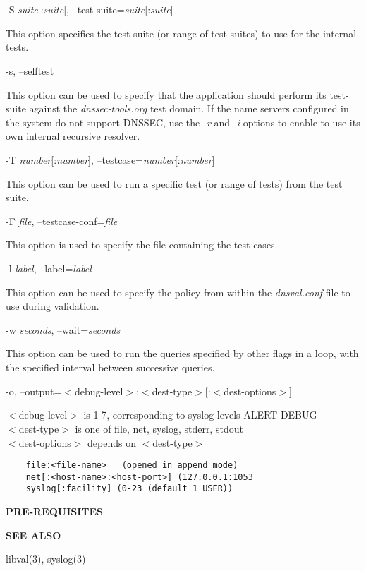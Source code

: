 \begin{description}
\item -S {\it suite}[:{\it suite}], --test-suite={\it suite}[:{\it suite}]\verb" "

This option specifies the test suite (or range of test suites) to use 
for the internal tests.

\item -s, --selftest\verb" "

This option can be used to specify that the application should perform its
test-suite against the {\it dnssec-tools.org} test domain.  If the name
servers configured in the system  do not support DNSSEC, use
the {\it -r} and {\it -i} options to enable  to use its own
internal recursive resolver.

\item -T {\it number}[:{\it number}], --testcase={\it number}[:{\it number}]\verb" "

This option can be used to run a specific test (or range of tests) 
from the test suite.

\item -F {\it file}, --testcase-conf={\it file} \verb" "

This option is used to specify the file containing the test cases.

\item -l {\it label}, --label={\it label} \verb" "

This option can be used to specify the policy from within the {\it dnsval.conf} 
file to use during validation. 

\item -w {\it seconds}, --wait={\it seconds} \verb" "

This option can be used to run the queries specified by other flags in a loop,
with the specified interval between successive queries.

\item -o, --output=$<$debug-level$>$:$<$dest-type$>$[:$<$dest-options$>$]\verb" "

$<$debug-level$>$ is 1-7, corresponding to syslog levels ALERT-DEBUG \\
$<$dest-type$>$ is one of file, net, syslog, stderr, stdout \\
$<$dest-options$>$ depends on $<$dest-type$>$ \\
\begin{verbatim}
    file:<file-name>   (opened in append mode)
    net[:<host-name>:<host-port>] (127.0.0.1:1053
    syslog[:facility] (0-23 (default 1 USER))
\end{verbatim}

\end{description}

{\bf PRE-REQUISITES}


{\bf SEE ALSO}

libval(3),
syslog(3)

